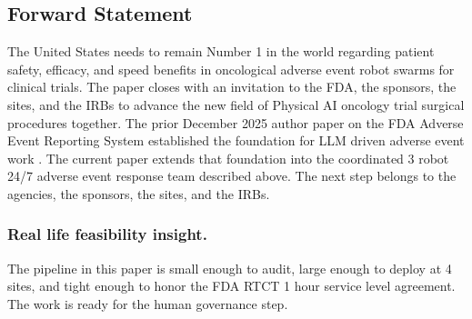 \begin{sectionaccent}
\subsection{Forward Statement}
\label{sec:conclusions-forward}

The United States needs to remain Number 1 in the world regarding
patient safety, efficacy, and speed benefits in oncological adverse
event robot swarms for clinical trials. The paper closes with an
invitation to the FDA, the sponsors, the sites, and the IRBs to
advance the new field of Physical AI oncology trial surgical
procedures together. The prior December 2025 author paper on the
FDA Adverse Event Reporting System established the foundation for
LLM driven adverse event work \cite{kawchak_2025_18029100}. The
current paper extends that foundation into the coordinated 3 robot
24/7 adverse event response team described above. The next step
belongs to the agencies, the sponsors, the sites, and the IRBs.

\subsubsection*{Real life feasibility insight.} The pipeline in this
paper is small enough to audit, large enough to deploy at 4 sites,
and tight enough to honor the FDA RTCT 1 hour service level
agreement. The work is ready for the human governance step.


\end{sectionaccent}
